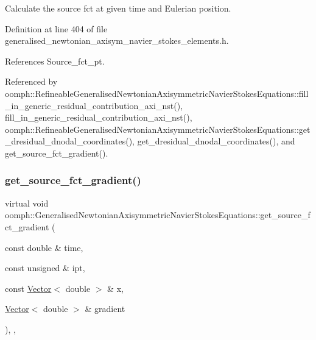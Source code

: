 Calculate the source fct at given time and Eulerian position. 



Definition at line 404 of file generalised\+\_\+newtonian\+\_\+axisym\+\_\+navier\+\_\+stokes\+\_\+elements.\+h.



References Source\+\_\+fct\+\_\+pt.



Referenced by oomph\+::\+Refineable\+Generalised\+Newtonian\+Axisymmetric\+Navier\+Stokes\+Equations\+::fill\+\_\+in\+\_\+generic\+\_\+residual\+\_\+contribution\+\_\+axi\+\_\+nst(), fill\+\_\+in\+\_\+generic\+\_\+residual\+\_\+contribution\+\_\+axi\+\_\+nst(), oomph\+::\+Refineable\+Generalised\+Newtonian\+Axisymmetric\+Navier\+Stokes\+Equations\+::get\+\_\+dresidual\+\_\+dnodal\+\_\+coordinates(), get\+\_\+dresidual\+\_\+dnodal\+\_\+coordinates(), and get\+\_\+source\+\_\+fct\+\_\+gradient().

\mbox{\label{classoomph_1_1GeneralisedNewtonianAxisymmetricNavierStokesEquations_a0848107a66e1a7403aad3b5d312b1603}} 
\subsubsection{\texorpdfstring{get\+\_\+source\+\_\+fct\+\_\+gradient()}{get\_source\_fct\_gradient()}}
{\footnotesize\ttfamily virtual void oomph\+::\+Generalised\+Newtonian\+Axisymmetric\+Navier\+Stokes\+Equations\+::get\+\_\+source\+\_\+fct\+\_\+gradient (\begin{DoxyParamCaption}\item[{const double \&}]{time,  }\item[{const unsigned \&}]{ipt,  }\item[{const \hyperlink{classoomph_1_1Vector}{Vector}$<$ double $>$ \&}]{x,  }\item[{\hyperlink{classoomph_1_1Vector}{Vector}$<$ double $>$ \&}]{gradient }\end{DoxyParamCaption})\hspace{0.3cm}{\ttfamily [inline]}, {\ttfamily [protected]}, {\ttfamily [virtual]}}

